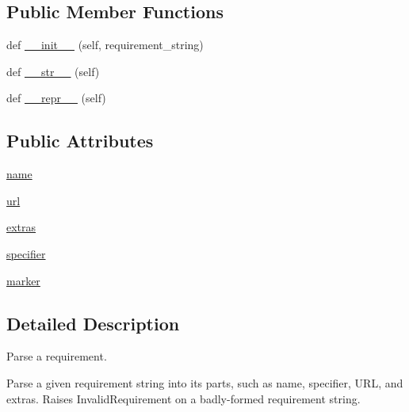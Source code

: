 \subsection*{Public Member Functions}
\begin{DoxyCompactItemize}
\item 
def \hyperlink{classpkg__resources_1_1__vendor_1_1packaging_1_1requirements_1_1Requirement_a1e814c031e2a8e5890dcfb8632f411bd}{\+\_\+\+\_\+init\+\_\+\+\_\+} (self, requirement\+\_\+string)
\item 
def \hyperlink{classpkg__resources_1_1__vendor_1_1packaging_1_1requirements_1_1Requirement_a59c0b571a8649df97b968342f51f89b4}{\+\_\+\+\_\+str\+\_\+\+\_\+} (self)
\item 
def \hyperlink{classpkg__resources_1_1__vendor_1_1packaging_1_1requirements_1_1Requirement_ab697e34a438027b6c114095ab3dc9d99}{\+\_\+\+\_\+repr\+\_\+\+\_\+} (self)
\end{DoxyCompactItemize}
\subsection*{Public Attributes}
\begin{DoxyCompactItemize}
\item 
\hyperlink{classpkg__resources_1_1__vendor_1_1packaging_1_1requirements_1_1Requirement_aa088c4b11bc205958e53ebda55dc7720}{name}
\item 
\hyperlink{classpkg__resources_1_1__vendor_1_1packaging_1_1requirements_1_1Requirement_a4e31ef5fb6d87065de754e8243a59538}{url}
\item 
\hyperlink{classpkg__resources_1_1__vendor_1_1packaging_1_1requirements_1_1Requirement_a56ab857c6c2550b767ed8b0b5df560a5}{extras}
\item 
\hyperlink{classpkg__resources_1_1__vendor_1_1packaging_1_1requirements_1_1Requirement_a5eb06f5796589cd8b83c393da8391bc5}{specifier}
\item 
\hyperlink{classpkg__resources_1_1__vendor_1_1packaging_1_1requirements_1_1Requirement_a417ac868955523d79713efe99cad293f}{marker}
\end{DoxyCompactItemize}


\subsection{Detailed Description}
\begin{DoxyVerb}Parse a requirement.

Parse a given requirement string into its parts, such as name, specifier,
URL, and extras. Raises InvalidRequirement on a badly-formed requirement
string.
\end{DoxyVerb}
 

